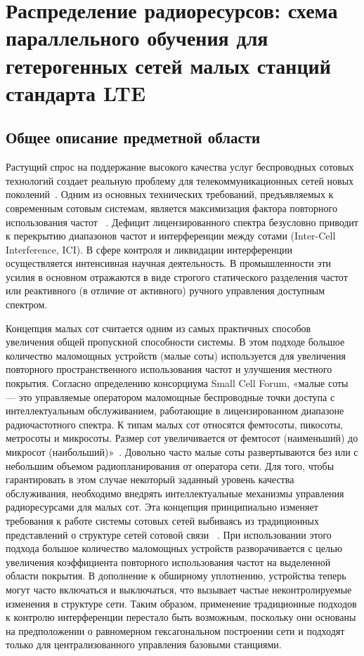 \chapter{Распределение радиоресурсов: схема параллельного обучения для гетерогенных сетей малых станций стандарта LTE} \label{chapt2}

\section{Общее описание предметной области} \label{sect2_1}

Растущий спрос на поддержание высокого качества услуг беспроводных сотовых технологий создает реальную проблему для телекоммуникационных сетей новых поколений~\cite{TS36.300}. Одним из основных технических требований, предъявляемых к современным сотовым системам, является максимизация фактора повторного использования частот ~\cite{M.1645}. Дефицит лицензированного спектра безусловно приводит к перекрытию диапазонов частот и интерференции между сотами (Inter-Cell Interference, ICI). В сфере контроля и ликвидации интерференции осуществляется интенсивная научная деятельность. В промышленности эти усилия в основном отражаются в виде строгого статического разделения частот или реактивного (в отличие от активного) ручного управления доступным спектром.

Концепция малых сот считается одним из самых практичных способов увеличения общей пропускной способности системы. В этом подходе большое количество маломощных устройств (малые соты) используется для увеличения повторного пространственного использования частот и улучшения местного покрытия. Согласно определению консорциума Small Cell Forum, «малые соты — это управляемые оператором маломощные беспроводные точки доступа с интеллектуальным обслуживанием, работающие в лицензированном диапазоне радиочастотного спектра. К типам малых сот относятся фемтосоты, пикосоты, метросоты и микросоты. Размер сот увеличивается от фемтосот (наименьший) до микросот (наибольший)»~\cite{6171992}. Довольно часто малые соты развертываются без или с небольшим объемом радиопланирования от оператора сети. Для того, чтобы гарантировать в этом случае некоторый заданный уровень качества обслуживания, необходимо внедрять интеллектуальные механизмы управления радиоресурсами для малых сот. Эта концепция принципиально изменяет требования к работе системы сотовых сетей выбиваясь из традиционных представлений о структуре сетей сотовой связи ~\cite{6211486}. При использовании этого подхода большое количество маломощных устройств разворачивается с целью увеличения коэффициента повторного использования частот на выделенной области покрытия. В дополнение к обширному уплотнению, устройства теперь могут часто включаться и выключаться, что вызывает частые неконтролируемые изменения в структуре сети. Таким образом, применение традиционные подходов к контролю интерференции перестало быть возможным, поскольку они основаны на предположении о равномерном гексагональном построении сети и подходят только для централизованного управления базовыми станциями.

